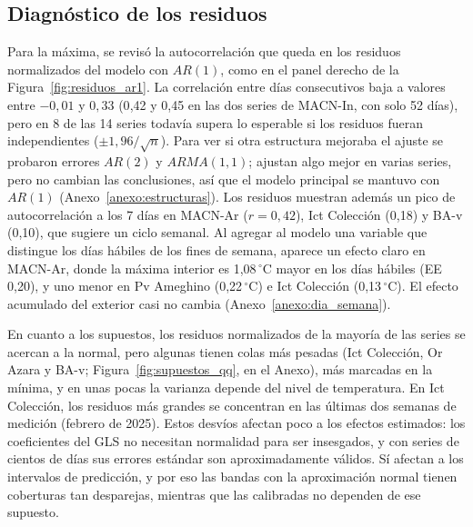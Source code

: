 \documentclass[11pt,a4paper]{article}
\begin{document}
\subsection{Diagnóstico de los residuos}
\label{sec:diagnostico}
Para la máxima, se revisó la autocorrelación que queda en los residuos normalizados del modelo con $AR(1)$, como en el panel derecho de la Figura~\ref{fig:residuos_ar1}. La correlación entre días consecutivos baja a valores entre $-0{,}01$ y $0{,}33$ (0{,}42 y 0{,}45 en las dos series de MACN-In, con solo 52 días), pero en 8 de las 14 series todavía supera lo esperable si los residuos fueran independientes ($\pm 1{,}96/\sqrt{n}$). Para ver si otra estructura mejoraba el ajuste se probaron errores $AR(2)$ y $ARMA(1,1)$; ajustan algo mejor en varias series, pero no cambian las conclusiones, así que el modelo principal se mantuvo con $AR(1)$ (Anexo~\ref{anexo:estructuras}). Los residuos muestran además un pico de autocorrelación a los 7 días en MACN-Ar ($r = 0{,}42$), Ict Colección (0{,}18) y BA-v (0{,}10), que sugiere un ciclo semanal. Al agregar al modelo una variable que distingue los días hábiles de los fines de semana, aparece un efecto claro en MACN-Ar, donde la máxima interior es 1{,}08\,$^\circ$C mayor en los días hábiles (EE 0{,}20), y uno menor en Pv Ameghino (0{,}22\,$^\circ$C) e Ict Colección (0{,}13\,$^\circ$C). El efecto acumulado del exterior casi no cambia (Anexo~\ref{anexo:dia_semana}).

En cuanto a los supuestos, los residuos normalizados de la mayoría de las series se acercan a la normal, pero algunas tienen colas más pesadas (Ict Colección, Or Azara y BA-v; Figura~\ref{fig:supuestos_qq}, en el Anexo), más marcadas en la mínima, y en unas pocas la varianza depende del nivel de temperatura. En Ict Colección, los residuos más grandes se concentran en las últimas dos semanas de medición (febrero de 2025). Estos desvíos afectan poco a los efectos estimados: los coeficientes del GLS no necesitan normalidad para ser insesgados, y con series de cientos de días sus errores estándar son aproximadamente válidos. Sí afectan a los intervalos de predicción, y por eso las bandas con la aproximación normal tienen coberturas tan desparejas, mientras que las calibradas no dependen de ese supuesto.
\end{document}
